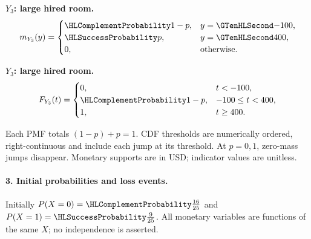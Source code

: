 \noindent\begin{minipage}[t]{.48\linewidth}
\textbf{$Y_3$: large hired room.}
\[m_{Y_3}(y)=\begin{cases}\FailureProb{1-p},&y=\Money{-100},\\\SuccessProb{p},&y=\Money{400},\\0,&\text{otherwise}.\end{cases}\]
\end{minipage}\par
{}
\noindent\begin{minipage}[t]{.48\linewidth}
\textbf{$Y_3$: large hired room.}
\[F_{Y_3}(t)=\begin{cases}0,&t<-100,\\\FailureProb{1-p},&-100\leq t<400,\\1,&t\geq 400.\end{cases}\]
\end{minipage}\par
Each PMF totals $(1-p)+p=1$. CDF thresholds are numerically ordered,
right-continuous and include each jump at its threshold. At $p=0,1$, zero-mass jumps disappear.
Monetary supports are in USD; indicator values are unitless.
\clearpage
{}\paragraph{3. Initial probabilities and loss events.}
Initially $P(X=0)=\FailureProb{\frac{16}{25}}$ and $P(X=1)=\SuccessProb{\frac{9}{25}}$.
All monetary variables are functions of the same $X$; no independence is asserted.
